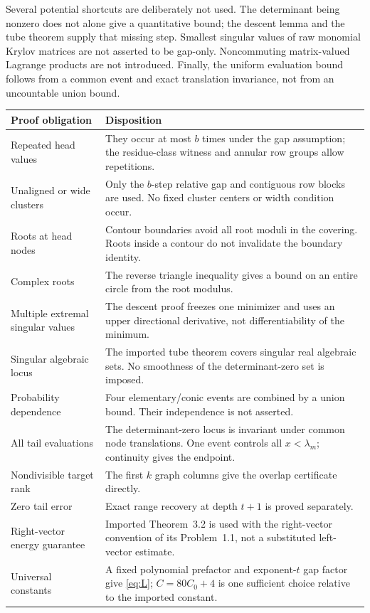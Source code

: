 \documentclass[11pt]{article}
\numberwithin{equation}{section}
\theoremstyle{definition}
\begin{document}
Several potential shortcuts are deliberately not used. The determinant being nonzero does not alone give a quantitative bound; the descent lemma and the tube theorem supply that missing step. Smallest singular values of raw monomial Krylov matrices are not asserted to be gap-only. Noncommuting matrix-valued Lagrange products are not introduced. Finally, the uniform evaluation bound follows from a common event and exact translation invariance, not from an uncountable union bound.

\begin{longtable}{p{}p{}}
\toprule
Proof obligation & Disposition\\
\midrule
\endhead
Repeated head values & They occur at most $b$ times under the gap assumption; the residue-class witness and annular row groups allow repetitions.\\
Unaligned or wide clusters & Only the $b$-step relative gap and contiguous row blocks are used. No fixed cluster centers or width condition occur.\\
Roots at head nodes & Contour boundaries avoid all root moduli in the covering. Roots inside a contour do not invalidate the boundary identity.\\
Complex roots & The reverse triangle inequality gives a bound on an entire circle from the root modulus.\\
Multiple extremal singular values & The descent proof freezes one minimizer and uses an upper directional derivative, not differentiability of the minimum.\\
Singular algebraic locus & The imported tube theorem covers singular real algebraic sets. No smoothness of the determinant-zero set is imposed.\\
Probability dependence & Four elementary/conic events are combined by a union bound. Their independence is not asserted.\\
All tail evaluations & The determinant-zero locus is invariant under common node translations. One event controls all $x<\lambda_m$; continuity gives the endpoint.\\
Nondivisible target rank & The first $k$ graph columns give the overlap certificate directly.\\
Zero tail error & Exact range recovery at depth $t+1$ is proved separately.\\
Right-vector energy guarantee & Imported Theorem~3.2 is used with the right-vector convention of its Problem~1.1, not a substituted left-vector estimate.\\
Universal constants & A fixed polynomial prefactor and exponent-$t$ gap factor give \eqref{eq:L}; $C=80C_0+4$ is one sufficient choice relative to the imported constant.\\
\bottomrule
\end{longtable}
\end{document}
